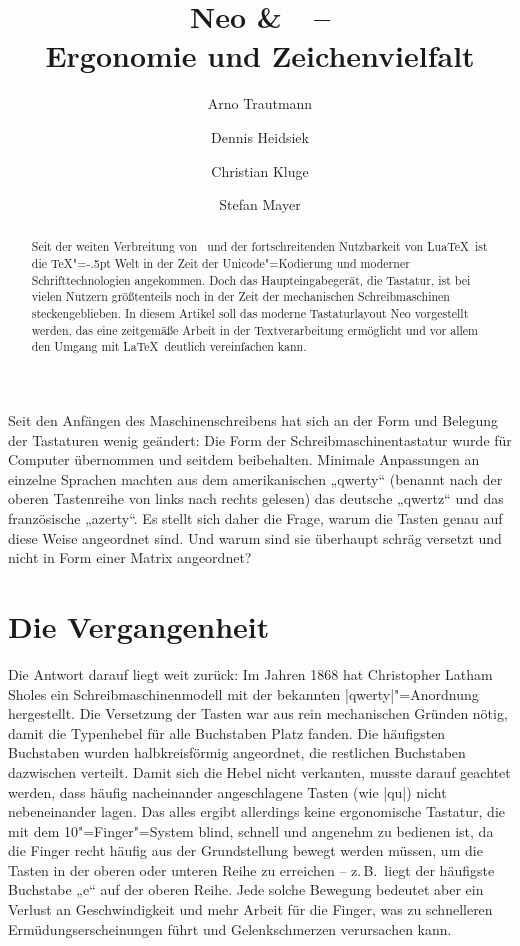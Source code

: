 \documentclass[ngerman]{dtk}
\title{Neo \&\ \XeLaTeX\ –\\ Ergonomie und Zeichenvielfalt}
\author{Arno Trautmann\and Dennis Heidsiek\and Christian Kluge\and Stefan Mayer}
\newcommand\LuaTeX{Lua\TeX}
\begin{document}
\setmonofont[Scale=0.8]{DejaVu Sans Mono}
\maketitle
\begin{abstract}
Seit der weiten Verbreitung von \XeTeX\ und der fortschreitenden Nutzbarkeit von \LuaTeX\ ist die  \TeX"=\kern-.5pt Welt in der Zeit der Unicode"=Kodierung und moderner Schrifttechnologien angekommen. Doch das Haupteingabegerät, die Tastatur, ist bei vielen Nutzern größtenteils noch in der Zeit der mechanischen Schreibmaschinen steckengeblieben. In diesem Artikel soll das moderne Tastaturlayout Neo vorgestellt werden, das eine zeitgemäße Arbeit in der Textverarbeitung ermöglicht und vor allem den Umgang mit \LaTeX\ deutlich vereinfachen kann.
\end{abstract}
Seit den Anfängen des Maschinenschreibens hat sich an der Form und Belegung der Tastaturen wenig geändert: Die Form der Schreibmaschinentastatur wurde für Computer übernommen und seitdem beibehalten. Minimale Anpassungen an einzelne Sprachen machten aus dem amerikanischen „\hbox{qwerty}“ (benannt nach der oberen Tastenreihe von links nach rechts gelesen) das deutsche „qwertz“ und das französische „azerty“. Es stellt sich daher die Frage, warum die Tasten genau auf diese Weise angeordnet sind. Und warum sind sie überhaupt schräg versetzt und nicht in Form einer Matrix angeordnet?

\section{Die Vergangenheit}
Die Antwort darauf liegt weit zurück: Im Jahren 1868 hat Christopher Latham Sholes ein Schreibmaschinenmodell mit der bekannten |qwerty|"=Anordnung hergestellt.\cite{patentqwerty} Die Versetzung der Tasten war aus rein mechanischen Gründen nötig, damit die Typenhebel für alle Buchstaben Platz fanden. Die häufigsten Buchstaben wurden halbkreisförmig angeordnet, die restlichen Buchstaben dazwischen verteilt. Damit sich die Hebel nicht verkanten, musste darauf geachtet werden, dass häufig nacheinander angeschlagene Tasten (wie |qu|) nicht nebeneinander lagen. Das alles ergibt allerdings keine ergonomische Tastatur, die mit dem 10"=Finger"=System blind, schnell und angenehm zu bedienen ist, da die Finger recht häufig aus der Grundstellung bewegt werden müssen, um die Tasten in der oberen oder unteren Reihe zu erreichen – z.\,B.\ liegt der häufigste Buchstabe „e“ auf der oberen Reihe. Jede solche Bewegung bedeutet aber ein Verlust an Geschwindigkeit und mehr Arbeit für die Finger, was zu schnelleren Ermüdungserscheinungen führt und Gelenkschmerzen verursachen kann.
\end{document}
